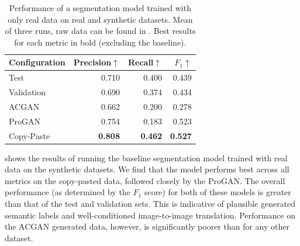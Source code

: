 \begin{table}[h]
    \centering
    \begin{tabular}{lrrr}
    \toprule
        Configuration & Precision$\uparrow$ & Recall$\uparrow$ & $F_1$$\uparrow$ \\
    \midrule 
    Test & 0.710 & 0.400 & 0.439 \\
    Validation & 0.690 & 0.374 & 0.434 \\
    \midrule
        ACGAN & 0.662 & 0.200 & 0.278 \\
    \midrule
        ProGAN & 0.754 & 0.183 & 0.523 \\
    \midrule
        Copy-Paste & \textbf{0.808} & \textbf{0.462} & \textbf{0.527} \\
    \bottomrule
    \end{tabular}
    \caption{Performance of a segmentation model trained with only real data on real and synthetic datasets. Mean of three runs, raw data can be found in . Best results for each metric in bold (excluding the baseline).}
    \label{tab:segmentation_performance}
\end{table}

 shows the results of running the baseline segmentation model trained with real data on the synthetic datasets.
We find that the model performs best across all metrics on the copy-pasted data, followed closely by the ProGAN.
The overall performance (as determined by the $F_1$ score) for both of these models is greater than that of the test and validation sets.
This is indicative of plausible generated semantic labels and well-conditioned image-to-image translation.
Performance on the ACGAN generated data, however, is significantly poorer than for any other dataset.

